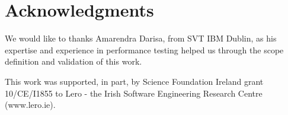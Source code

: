 \documentclass[runningheads,a4paper]{llncs}
\begin{document}

\section*{Acknowledgments}

We would like to thanks Amarendra Darisa, from SVT IBM Dublin, as his expertise
and experience in performance testing helped us through the scope definition and validation of this work.

This work was supported, in part, by Science Foundation Ireland grant 10/CE/I1855 to Lero - the Irish Software Engineering Research Centre (www.lero.ie).




\end{document}
